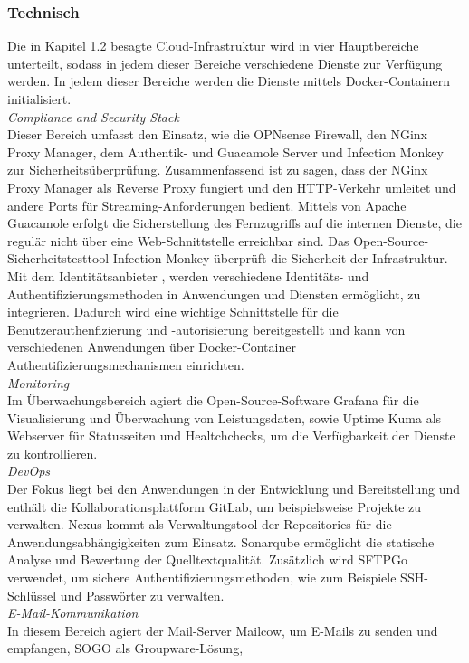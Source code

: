 \subsubsection{Technisch}
\label{sec:Technisch}
Die in Kapitel 1.2 besagte Cloud-Infrastruktur wird in vier  
Hauptbereiche unterteilt, sodass in jedem dieser Bereiche verschiedene Dienste zur Verfügung werden. In jedem dieser Bereiche 
werden die Dienste mittels Docker-Containern initialisiert.
\\\textit{Compliance and Security Stack}
\\Dieser Bereich umfasst den Einsatz, wie die OPNsense Firewall, den NGinx Proxy Manager, dem Authentik- und Guacamole Server 
und Infection Monkey zur Sicherheitsüberprüfung. Zusammenfassend ist zu sagen, dass der NGinx Proxy Manager als Reverse Proxy 
fungiert und den HTTP-Verkehr umleitet und andere Ports für Streaming-Anforderungen bedient. Mittels von Apache Guacamole 
erfolgt die Sicherstellung des Fernzugriffs auf die internen Dienste, die regulär nicht über eine Web-Schnittstelle erreichbar sind.
Das Open-Source-Sicherheitstesttool Infection Monkey überprüft die Sicherheit der Infrastruktur. 
Mit dem Identitätsanbieter \cite{Authentik}, werden verschiedene Identitäts- und Authentifizierungsmethoden in 
Anwendungen und Diensten ermöglicht, zu integrieren. Dadurch wird eine wichtige Schnittstelle für die 
Benutzerauthenfizierung und -autorisierung bereitgestellt und kann von verschiedenen Anwendungen über 
Docker-Container Authentifizierungsmechanismen einrichten.
\\\textit{Monitoring}
\\Im Überwachungsbereich agiert die Open-Source-Software Grafana für die Visualisierung und Überwachung von Leistungsdaten, sowie 
Uptime Kuma als Webserver für Statusseiten und Healtchchecks, um die Verfügbarkeit der Dienste zu kontrollieren. 
\\\textit{DevOps}
\\Der Fokus liegt bei den Anwendungen in der Entwicklung und Bereitstellung und enthält die 
Kollaborationsplattform GitLab, um beispielsweise Projekte zu verwalten. 
Nexus kommt als Verwaltungstool der Repositories für die Anwendungsabhängigkeiten zum Einsatz. Sonarqube ermöglicht die 
statische Analyse und Bewertung der Quelltextqualität. Zusätzlich wird SFTPGo verwendet, um sichere Authentifizierungsmethoden, 
wie zum Beispiele SSH-Schlüssel und Passwörter zu verwalten.
\\\textit{E-Mail-Kommunikation}
\\In diesem Bereich agiert der Mail-Server Mailcow, um E-Mails zu senden und empfangen, SOGO als Groupware-Lösung, 
